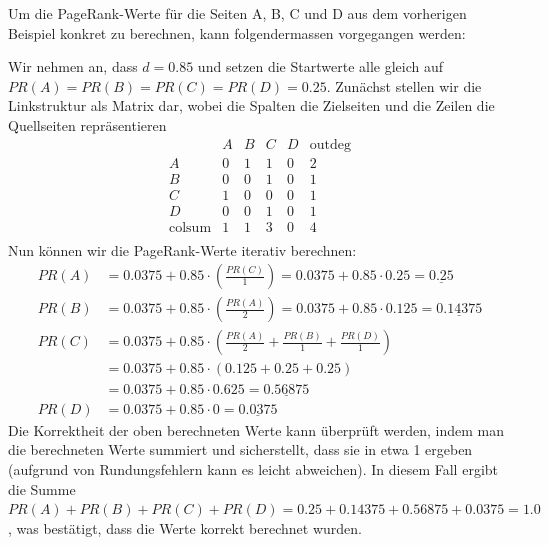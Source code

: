 \begin{myexample}
    Um die PageRank-Werte für die Seiten A, B, C und D aus dem vorherigen Beispiel konkret zu berechnen, kann folgendermassen vorgegangen werden:


    Wir nehmen an, dass $d=0.85$ und setzen die Startwerte alle gleich auf $PR(A)=PR(B)=PR(C)=PR(D)=0.25$. Zunächst stellen wir die Linkstruktur als Matrix dar, wobei die Spalten die Zielseiten und die Zeilen die Quellseiten repräsentieren
    \[
        \begin{array}{c|cccc|c}
                          & A & B & C & D & \text{outdeg} \\
            \hline
            A             & 0 & 1 & 1 & 0 & 2             \\
            B             & 0 & 0 & 1 & 0 & 1             \\
            C             & 1 & 0 & 0 & 0 & 1             \\
            D             & 0 & 0 & 1 & 0 & 1             \\
            \hline
            \text{colsum} & 1 & 1 & 3 & 0 & 4             \\
        \end{array}
    \]
    Nun können wir die PageRank-Werte iterativ berechnen:
    \[
        \begin{aligned}
            PR(A) & = 0.0375 + 0.85 \cdot \left(\frac{PR(C)}{1}\right) = 0.0375 + 0.85 \cdot 0.25 = \underline{0.25}     \\
            PR(B) & = 0.0375 + 0.85 \cdot \left(\frac{PR(A)}{2}\right) = 0.0375 + 0.85 \cdot 0.125 = \underline{0.14375} \\
            PR(C) & = 0.0375 + 0.85 \cdot \left(\frac{PR(A)}{2} + \frac{PR(B)}{1} + \frac{PR(D)}{1}\right)               \\
                  & =0.0375 + 0.85 \cdot (0.125 + 0.25 + 0.25)                                                           \\
                  & =0.0375 + 0.85 \cdot 0.625 = \underline{0.56875}                                                     \\
            PR(D) & = 0.0375 + 0.85 \cdot 0 = \underline{0.0375}
        \end{aligned}
    \]
    Die Korrektheit der oben berechneten Werte kann überprüft werden, indem man die berechneten Werte summiert und sicherstellt, dass sie in etwa 1 ergeben (aufgrund von Rundungsfehlern kann es leicht abweichen). In diesem Fall ergibt die Summe $PR(A) + PR(B) + PR(C) + PR(D) = 0.25 + 0.14375 + 0.56875 + 0.0375 = 1.0$, was bestätigt, dass die Werte korrekt berechnet wurden.
\end{myexample}

